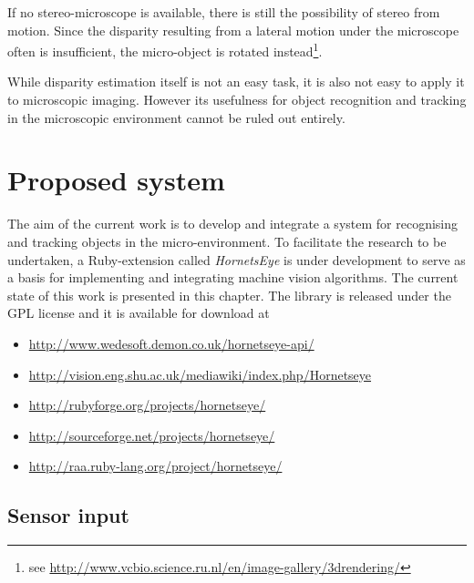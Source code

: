 \documentclass[a4paper,12pt]{book}
\begin{document}
If no stereo-microscope is available, there is still the possibility of
stereo from motion. Since the disparity resulting from a lateral motion under
the microscope often is insufficient, the micro-object is rotated
instead\footnote{see \url{http://www.vcbio.science.ru.nl/en/image-gallery/3drendering/}}.

While disparity estimation itself is not an easy task, it is also not easy
to apply it to microscopic imaging. However its usefulness for object
recognition and tracking in the microscopic environment cannot be ruled out
entirely.

\chapter{Proposed system}
The aim of the current work is to develop and integrate a system for
recognising and tracking objects in the micro-environment. %
To facilitate the research to be undertaken, a Ruby-extension called
\emph{HornetsEye} is under development to serve as a basis for implementing
and integrating machine vision algorithms. The current state of this work is
presented in this chapter. The library is released under the GPL license and
it is available for download at
\begin{itemize}
\item \url{http://www.wedesoft.demon.co.uk/hornetseye-api/}
\item \url{http://vision.eng.shu.ac.uk/mediawiki/index.php/Hornetseye}
\item \url{http://rubyforge.org/projects/hornetseye/}
\item \url{http://sourceforge.net/projects/hornetseye/}
\item \url{http://raa.ruby-lang.org/project/hornetseye/}
\end{itemize}

\section{Sensor input}
\end{document}
